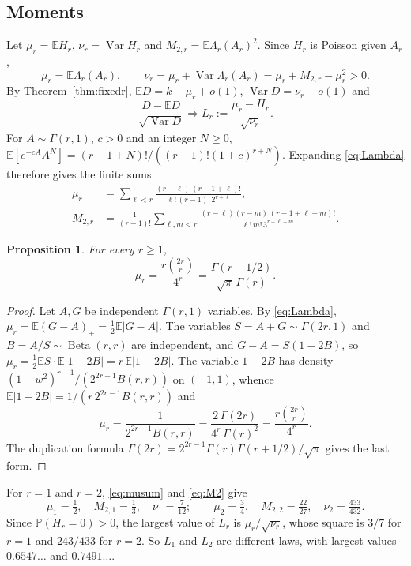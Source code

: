 \documentclass[11pt]{amsart}
\newtheorem{proposition}[theorem]{Proposition}
\theoremstyle{remark}
\numberwithin{equation}{section}
\newcommand{\E}{\mathbb E}
\newcommand{\Pp}{\mathbb P}
\newcommand{\1}{\mathbf 1}
\newcommand{\Var}{\operatorname{Var}}
\newcommand{\Bet}{\operatorname{Beta}}
\begin{document}
\subsection{Moments}
Let $\mu_r=\E H_r$, $\nu_r=\Var H_r$ and $M_{2,r}=\E\Lambda_r(A_r)^2$. Since $H_r$ is Poisson given $A_r$,
\[
\mu_r=\E\Lambda_r(A_r),\qquad \nu_r=\mu_r+\Var\Lambda_r(A_r)=\mu_r+M_{2,r}-\mu_r^2>0.
\]
By Theorem~\ref{thm:fixedr}, $\E D=k-\mu_r+o(1)$, $\Var D=\nu_r+o(1)$ and
\[
\frac{D-\E D}{\sqrt{\Var D}}\Longrightarrow L_r:=\frac{\mu_r-H_r}{\sqrt{\nu_r}}.
\]
For $A\sim\Gamma(r,1)$, $c>0$ and an integer $N\ge0$, $\E[e^{-cA}A^N]=(r-1+N)!/((r-1)!(1+c)^{r+N})$. Expanding \eqref{eq:Lambda} therefore gives the finite sums
\begin{align}
\mu_r&=\sum_{\ell<r}\frac{(r-\ell)\,(r-1+\ell)!}{\ell!\,(r-1)!\,2^{r+\ell}},\label{eq:musum}\\
M_{2,r}&=\frac1{(r-1)!}\sum_{\ell,m<r}\frac{(r-\ell)(r-m)\,(r-1+\ell+m)!}{\ell!\,m!\,3^{r+\ell+m}}.\label{eq:M2}
\end{align}

\begin{proposition}\label{prop:mu}
For every $r\ge1$,
\[
\mu_r=\frac{r\binom{2r}r}{4^r}=\frac{\Gamma(r+1/2)}{\sqrt\pi\,\Gamma(r)}.
\]
\end{proposition}

\begin{proof}
Let $A,G$ be independent $\Gamma(r,1)$ variables. By \eqref{eq:Lambda}, $\mu_r=\E(G-A)_+=\tfrac12\E|G-A|$. The variables $S=A+G\sim\Gamma(2r,1)$ and $B=A/S\sim\Bet(r,r)$ are independent, and $G-A=S(1-2B)$, so $\mu_r=\tfrac12\E S\cdot\E|1-2B|=r\,\E|1-2B|$. The variable $1-2B$ has density $(1-w^2)^{r-1}/(2^{2r-1}B(r,r))$ on $(-1,1)$, whence $\E|1-2B|=1/(r\,2^{2r-1}B(r,r))$ and
\[
\mu_r=\frac1{2^{2r-1}B(r,r)}=\frac{2\,\Gamma(2r)}{4^r\,\Gamma(r)^2}=\frac{r\binom{2r}r}{4^r}.
\]
The duplication formula $\Gamma(2r)=2^{2r-1}\Gamma(r)\Gamma(r+1/2)/\sqrt\pi$ gives the last form.
\end{proof}

For $r=1$ and $r=2$, \eqref{eq:musum} and \eqref{eq:M2} give
\begin{equation}\label{eq:r12}
\mu_1=\tfrac12,\quad M_{2,1}=\tfrac13,\quad \nu_1=\tfrac7{12};\qquad \mu_2=\tfrac34,\quad M_{2,2}=\tfrac{22}{27},\quad \nu_2=\tfrac{433}{432}.
\end{equation}
Since $\Pp(H_r=0)>0$, the largest value of $L_r$ is $\mu_r/\sqrt{\nu_r}$, whose square is $3/7$ for $r=1$ and $243/433$ for $r=2$. So $L_1$ and $L_2$ are different laws, with largest values $0.6547\ldots$ and $0.7491\ldots$.
\end{document}
